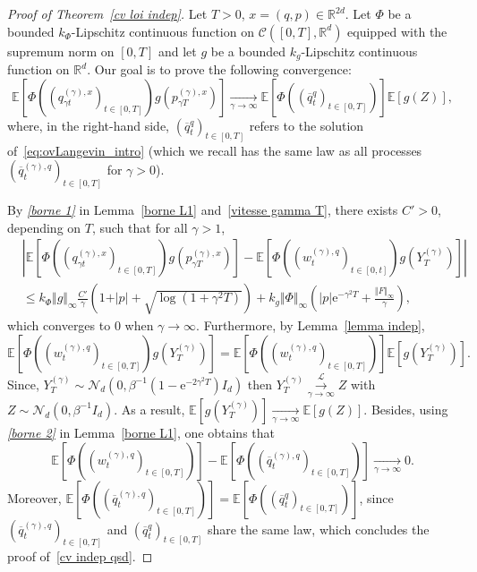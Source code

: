 \documentclass[preprint,EJP]{ejpecp}
\begin{document}
\begin{proof}[Proof of Theorem~\ref{cv loi indep}]
Let $T>0$, $x=(q,p)\in\mathbb{R}^{2d}$. Let $\Phi$ be a bounded $k_\Phi$-Lipschitz continuous function on $\mathcal{C}([0,T],\mathbb{R}^d)$ equipped with the supremum norm on $[0,T]$ and let $g$ be a bounded $k_g$-Lipschitz continuous function on $\mathbb{R}^d$. Our goal is to prove the following convergence: 
\begin{equation}\label{cv indep qsd}
    \mathbb{E}\left[\Phi((q^{(\gamma),x}_{\gamma t})_{t\in[0,T]}) g(p^{(\gamma),x}_{\gamma T})\right]\underset{\gamma\rightarrow\infty}{\longrightarrow}\mathbb{E}\left[\Phi((\overline{q}^q_{t})_{t\in[0,T]})\right] \mathbb{E}\left[g(Z)\right],
\end{equation}
where, in the right-hand side, $(\overline{q}^q_{t})_{t\in[0,T]}$ refers to the solution of~\eqref{eq:ovLangevin_intro} (which we recall has the same law as all processes $(\overline{q}^{(\gamma),q}_{t})_{t\in[0,T]}$ for $\gamma>0$).

By \emph{\eqref{borne 1}} in Lemma~\ref{borne L1} and~\eqref{vitesse gamma T}, there exists $C'>0$, depending on $T$, such that for all $\gamma>1$, 
\begin{align*}
    &\left\vert\mathbb{E}\left[\Phi((q^{(\gamma),x}_{\gamma t})_{t\in[0,T]}) g(p^{(\gamma),x}_{\gamma T})\right]-\mathbb{E}\left[\Phi((w^{(\gamma),q}_{t})_{t\in[0,t]}) g(Y_T^{(\gamma)})\right]\right\vert\\
    &\leq k_\Phi \Vert g\Vert_\infty\frac{C'}{\gamma}\left(1+\vert p\vert+ \sqrt{\log(1+\gamma^2T)}\right)+ k_g \Vert\Phi\Vert_\infty\left(\vert p\vert \mathrm{e}^{-\gamma^2 T}+\frac{\Vert F\Vert_\infty}{\gamma}\right),
\end{align*} 
which converges to $0$ when $\gamma\rightarrow\infty$. Furthermore, by Lemma~\ref{lemma indep},
$$\mathbb{E}\left[\Phi((w^{(\gamma),q}_{t})_{t\in[0,T]}) g(Y_T^{(\gamma)})\right]=\mathbb{E}\left[\Phi((w^{(\gamma),q}_{t})_{t\in[0,T]})\right] \mathbb{E}\left[g(Y_T^{(\gamma)})\right] .$$
Since,
$Y_T^{(\gamma)} \sim \mathcal{N}_d(0,\beta^{-1}(1-\mathrm{e}^{-2 \gamma^2 T}) I_d)$ then $Y_T^{(\gamma)}\overset{\mathcal{L}}{\underset{\gamma\rightarrow\infty}{\longrightarrow}}Z$ with $Z \sim \mathcal{N}_d(0,\beta^{-1} I_d )$. As a result, $\mathbb{E}[g(Y_T^{(\gamma)})]\underset{\gamma\rightarrow\infty}{\longrightarrow}\mathbb{E}[g(Z)]$. Besides, using \emph{\eqref{borne 2}} in Lemma~\ref{borne L1}, one obtains that  $$\mathbb{E}\left[\Phi((w^{(\gamma),q}_{t})_{t\in[0,T]})\right]-\mathbb{E}\left[\Phi((\overline{q}^{(\gamma),q}_{t})_{t\in[0,T]})\right]\underset{\gamma\rightarrow\infty}{\longrightarrow}0.$$
Moreover, $\mathbb{E}[\Phi((\overline{q}^{(\gamma),q}_{t})_{t\in[0,T]})]=\mathbb{E}[\Phi((\overline{q}^q_{t})_{t\in[0,T]})]$, since $(\overline{q}^{(\gamma),q}_{t})_{t\in[0,T]}$ and $(\overline{q}^q_{t})_{t\in[0,T]}$ share the same law, which concludes the proof of~\eqref{cv indep qsd}.
\end{proof}
\end{document}
